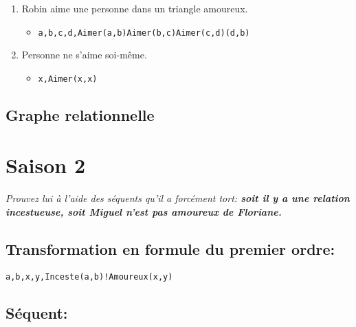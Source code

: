 \documentclass[Arial, 11pt]{article}
\begin{document}
\begin{enumerate}
\begin{itemize}
    \end{itemize}
    \item Robin aime une personne dans un triangle amoureux.
    \begin{itemize}
        \item \begin{alltt}\exists a,b,c,d, Aimer(a,b) \bigwedge Aimer(b,c) \bigwedge Aimer(c,d) \bigwedge (d,b)\end{alltt}
    \end{itemize}
    \item Personne ne s'aime soi-même.
    \begin{itemize}
        \item \begin{alltt}\forall x, \neg Aimer(x,x)\end{alltt}
    \end{itemize}
\end{enumerate}
\subsection*{Graphe relationnelle}
\section{Saison 2}
\emph{
Prouvez lui à l’aide des séquents qu’il a forcément tort:
\textbf{soit il y a une relation incestueuse, soit Miguel n’est pas amoureux de Floriane.}}

\subsection*{Transformation en formule du premier ordre:}
\begin{alltt}\exists a,b,x,y, Inceste(a,b) \bigvee !Amoureux(x,y)\end{alltt}

\subsection*{Séquent:}
\begin{alltt}\end{alltt}
\end{document}
